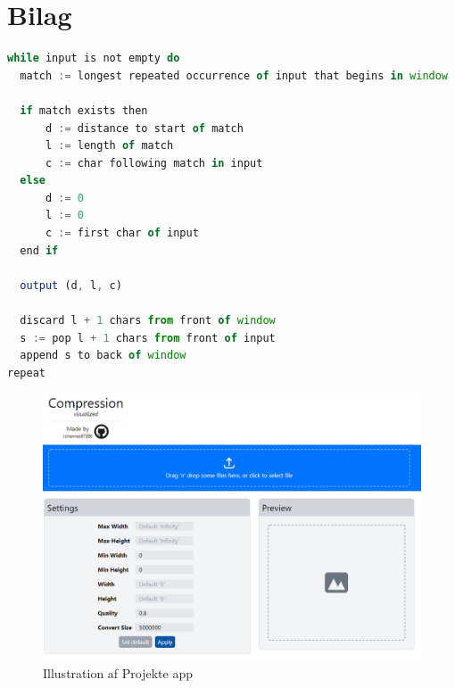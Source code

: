 \documentclass[12pt]{article}
\begin{document}
\section{Bilag}
\begin{lstlisting}[language=JavaScript, caption=LZ77 Pseudocode]
while input is not empty do
  match := longest repeated occurrence of input that begins in window
  
  if match exists then
      d := distance to start of match
      l := length of match
      c := char following match in input
  else
      d := 0
      l := 0
      c := first char of input
  end if
  
  output (d, l, c)
  
  discard l + 1 chars from front of window
  s := pop l + 1 chars from front of input
  append s to back of window
repeat

\end{lstlisting}
\begin{figure}[ht]%
  \centering
  \includegraphics[width=17cm]{Apppreview.png}
  \caption{\centering Illustration af Projekte app}
\end{figure}
\newpage

\printbibliography[title={Litteraturliste}]
\end{document}
